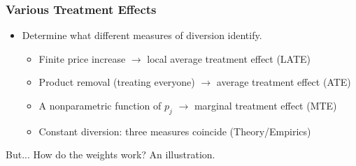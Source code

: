 \documentclass[xcolor=pdftex,dvipsnames,table,mathserif]{beamer}
\begin{document}
\begin{frame}
\frametitle{Various Treatment Effects}
\begin{itemize}
\item Determine what different measures of diversion identify.
\begin{itemize}
\item Finite price increase $\rightarrow$ local average treatment effect (LATE)
\item Product removal (treating everyone) $\rightarrow$ average treatment effect (ATE)
\item A nonparametric function of $p_j$ $\rightarrow$ marginal treatment effect (MTE) 
\item Constant diversion: three measures coincide (Theory/Empirics)
\end{itemize}
\end{itemize}
 But... How do the weights work? An illustration.
 \end{frame}


\end{document}
